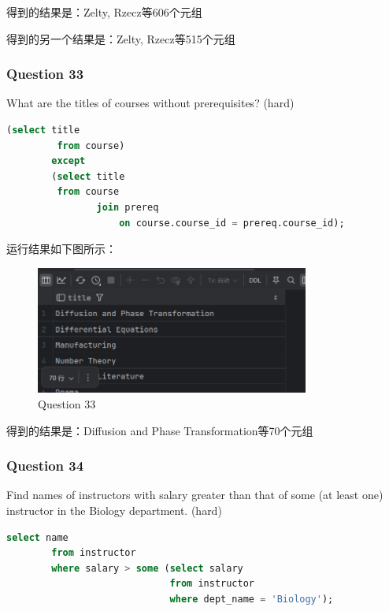 \documentclass{article}
\begin{document}
    得到的结果是：Zelty, Rzecz等606个元组

	
	得到的另一个结果是：Zelty, Rzecz等515个元组
    
    \subsubsection{Question 33}
    
    What are the titles of courses without prerequisites?  (hard)
    
    \begin{lstlisting}[language=sql, title=Question 33, tabsize=4]
    	(select title
    	 from course)
    	except
    	(select title
    	 from course
    			join prereq
    				on course.course_id = prereq.course_id);
    \end{lstlisting}
    
    运行结果如下图所示：
    
    \begin{figure}[H]
    	\centering
    	\includegraphics[width=9cm]{./images/37.Question33.png}
    	\caption{Question 33}
    \end{figure}
    
    得到的结果是：Diffusion and Phase Transformation等70个元组
    
    \subsubsection{Question 34}
    
    Find names of instructors with salary greater than that of some (at least one) instructor in the Biology department.  (hard)
    
    \begin{lstlisting}[language=sql, title=Question 34, tabsize=4]
    	select name
    	from instructor
    	where salary > some (select salary
    						 from instructor
    						 where dept_name = 'Biology');
    \end{lstlisting}
    
\end{document}
